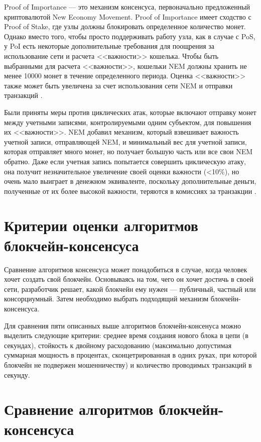 \documentclass{bmstu}
\begin{document}
Proof of Importance --- это механизм консенсуса, первоначально предложенный криптовалютой New Economy Movement. 
Proof of Importance имеет сходство с Proof of Stake, где узлы должны блокировать определенное количество монет. 
Однако вместо того, чтобы просто поддерживать работу узла, как в случае с PoS, у PoI есть некоторые дополнительные требования для поощрения за использование сети и расчета <<важности>> кошелька.  
Чтобы быть выбранными для расчета <<важности>>, кошельки NEM должны хранить не менее 10000 монет в течение определенного периода. 
Оценка <<важности>> также может быть увеличена за счет использования сети NEM и отправки транзакций \cite{Auhl2022}.

Были приняты меры против циклических атак, которые включают отправку монет между учетными записями, контролируемыми одним субъектом, для повышения их <<важности>>. 
NEM добавил механизм, который взвешивает важность учетной записи, отправляющей NEM, и минимальный вес для учетной записи, которая отправляет много монет, но получает большую часть или все свои NEM обратно. 
Даже если учетная запись попытается совершить циклическую атаку, она получит незначительное увеличение своей оценки важности (<10\%), но очень мало выиграет в денежном эквиваленте, поскольку дополнительные деньги, полученные от их более высокой важности, теряются в комиссиях за транзакции \cite{Auhl2022}. 

\section{Критерии оценки алгоритмов блокчейн-консенсуса}

Сравнение алгоритмов консенсуса может понадобиться в случае, когда человек хочет создать свой блокчейн. 
Основываясь на том, чего он хочет достичь в своей сети, разработчик решает, какой блокчейн ему нужен --- публичный, частный или консорциумный. 
Затем необходимо выбрать подходящий механизм блокчейн-консенсуса.

Для сравнения пяти описанных выше алгоритмов блокчейн-консенуса можно выделить следующие критерии: среднее время создания нового блока в цепи (в секундах), стойкость к двойному расходованию (максимально допустимая суммарная мощность в процентах, сконцетрированная в одних руках, при которой блокчейн не подвержен мошенничеству) и количество проводимых транзакций в секунду.

\section{Сравнение алгоритмов блокчейн-консенсуса}
\end{document}
